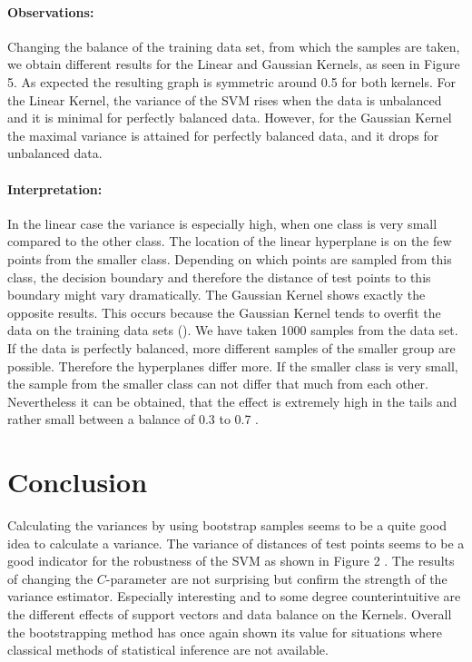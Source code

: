 \documentclass[a4paper]{article}
\begin{document}
\paragraph{Observations:}
Changing the balance of the training data set, from which the samples are taken, we obtain different results for the Linear and Gaussian Kernels, as  seen in Figure 5\label{fig5}. As expected the resulting graph is symmetric around 0.5 for both kernels. For the Linear Kernel, the variance of the SVM rises when the data is unbalanced and it is minimal for perfectly balanced data. However, for the Gaussian Kernel the maximal variance is attained for perfectly balanced data, and it drops for unbalanced data. 
\paragraph{Interpretation:}
In the linear case the variance is especially high, when one class is very small compared to the other class. The location of the linear hyperplane is on the few points from the smaller class. Depending on  which points are sampled from this class, the decision boundary and therefore the distance of test points to this boundary might vary dramatically.
The Gaussian Kernel shows exactly the opposite results. This occurs because the Gaussian Kernel tends to overfit the data on the training data sets (\cite{hastie_elements_2005}). We have taken 1000 samples from the data set. If the data is perfectly balanced, more different samples of the smaller group are possible. Therefore the hyperplanes differ more. If the smaller class is very small, the sample from the smaller class can not differ that much from each other.
Nevertheless it can be obtained, that the effect is extremely high in the tails and rather small between a balance of 0.3 to 0.7 .


\section{Conclusion}

Calculating the variances by using bootstrap samples seems to be a quite good idea to calculate a variance. The variance of distances of test points seems to be a good indicator for the robustness of the SVM as shown in Figure 2 \label{fig2}.
The results of changing the $C$-parameter are not surprising but confirm the strength of the variance estimator.
Especially interesting and to some degree counterintuitive are the different effects of support vectors and data balance on the Kernels.
Overall the bootstrapping method has once again shown its value for situations where classical methods of statistical inference are not available.
\end{document}
